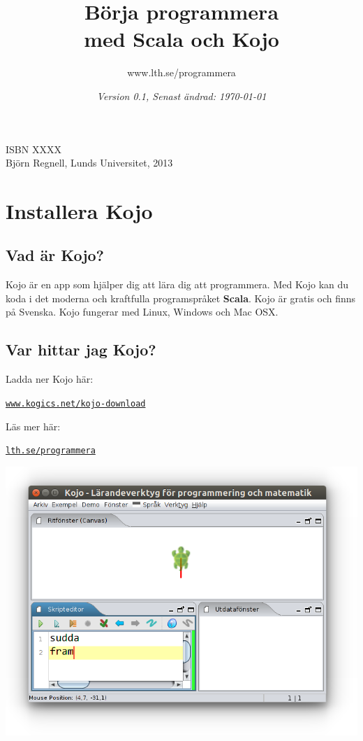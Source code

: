 \documentclass[12pt]{book}
\title{\fontsize{40}{40}\bf\sffamily\selectfont Börja programmera\\med Scala och Kojo\vskip2cm  }
\author{\fontsize{18}{18}\selectfont www.lth.se/programmera}
\date{\fontsize{12}{12}\vskip3cm\it\selectfont Version 0.1, Senast ändrad: \today{ }}
\begin{document}
\maketitle
\newpage
\thispagestyle{empty}


{ \vspace{250mm}\fontsize{11}{11}\flushleft\selectfont 
\vspace*{\fill}
ISBN XXXX \\
\textcopyright{ }Björn Regnell, Lunds Universitet, 2013 \\
}
\newpage
\begin{multicols}{4}
\tableofcontents
\mainmatter
\end{multicols}

\fontsize{16}{18}\selectfont\raggedright

\chapter{Installera Kojo}
\begin{multicols}{2}
\section*{Vad är Kojo?}

Kojo är en app som hjälper dig att lära dig att programmera. 
Med Kojo kan du koda i det moderna och kraftfulla programspråket {\bf\color{blue}Scala}. 
Kojo är gratis och finns på Svenska. 
Kojo fungerar med Linux, Windows och Mac OSX.

\section*{Var hittar jag Kojo?}

Ladda ner Kojo här: 

\href{http://www.kogics.net/kojo-download}{\tt www.kogics.net/kojo-download}  

Läs mer här: 

\href{http://lth.se/programmera}{\tt lth.se/programmera}

\columnbreak

\includegraphics[width=14cm]{../img/kojo.png}

\end{multicols}


\end{document}
